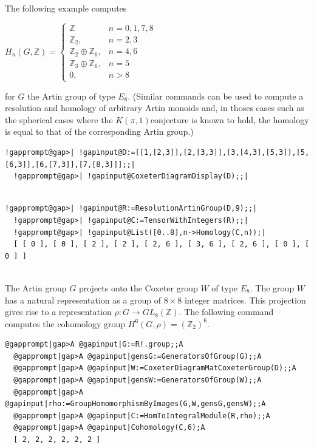 \documentclass[a4paper,11pt]{report}
\begin{document}
{{The following example computes 

$H_n(G,\mathbb Z) =\left\{ \begin{array}{ll} \mathbb Z &n=0,1,7,8\\ \mathbb
Z_2, &n=2,3\\ \mathbb Z_2\oplus \mathbb Z_6, &n=4,6\\ \mathbb Z_3 \oplus
\mathbb Z_6,& n=5\\ 0, &n>8 \end{array}\right. $ 

for $G$ the Artin group of type $E_8$. (Similar commands can be used to compute a resolution and homology of
arbitrary Artin monoids and, in thoses cases such as the spherical cases where
the $K(\pi,1)$\texttt{}conjecture is known to hold, the homology is equal to that
of the corresponding Artin group.) 
\begin{Verbatim}[commandchars=!@|,fontsize=\small,frame=single,label=Example]
  !gapprompt@gap>| !gapinput@D:=[[1,[2,3]],[2,[3,3]],[3,[4,3],[5,3]],[5,[6,3]],[6,[7,3]],[7,[8,3]]];;|
  !gapprompt@gap>| !gapinput@CoxeterDiagramDisplay(D);;|
  
\end{Verbatim}
  
\begin{Verbatim}[commandchars=!@|,fontsize=\small,frame=single,label=Example]
  !gapprompt@gap>| !gapinput@R:=ResolutionArtinGroup(D,9);;|
  !gapprompt@gap>| !gapinput@C:=TensorWithIntegers(R);;|
  !gapprompt@gap>| !gapinput@List([0..8],n->Homology(C,n));|
  [ [ 0 ], [ 0 ], [ 2 ], [ 2 ], [ 2, 6 ], [ 3, 6 ], [ 2, 6 ], [ 0 ], [ 0 ] ]
  
\end{Verbatim}
 The Artin group $G$ projects onto the Coxeter group $W$ of type $E_8$. The group $W$ has a natural representation as a group of $8\times 8$ integer matrices. This projection gives rise to a representation $\rho\colon G\rightarrow GL_8(\mathbb Z)$. The following command computes the cohomology group $H^6(G,\rho) = (\mathbb Z_2)^6$. 
\begin{Verbatim}[commandchars=@|A,fontsize=\small,frame=single,label=Example]
  @gapprompt|gap>A @gapinput|G:=R!.group;;A
  @gapprompt|gap>A @gapinput|gensG:=GeneratorsOfGroup(G);;A
  @gapprompt|gap>A @gapinput|W:=CoxeterDiagramMatCoxeterGroup(D);;A
  @gapprompt|gap>A @gapinput|gensW:=GeneratorsOfGroup(W);;A
  @gapprompt|gap>A @gapinput|rho:=GroupHomomorphismByImages(G,W,gensG,gensW);;A
  @gapprompt|gap>A @gapinput|C:=HomToIntegralModule(R,rho);;A
  @gapprompt|gap>A @gapinput|Cohomology(C,6);A
  [ 2, 2, 2, 2, 2, 2 ]
  

\end{Verbatim}}}
\end{document}
